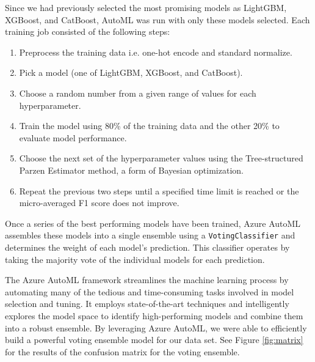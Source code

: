 \documentclass{article}
\begin{document}
Since we had previously selected the most promising models as LightGBM, XGBoost, and CatBoost, AutoML was run with only these models selected. Each training job consisted of the following steps:

\begin{enumerate}
  \item Preprocess the training data i.e. one-hot encode and standard normalize.
  \item Pick a model (one of LightGBM, XGBoost, and CatBoost).
  \item Choose a random number from a given range of values for each hyperparameter.
  \item Train the model using 80\% of the training data and the other 20\% to evaluate model performance.
  \item Choose the next set of the hyperparameter values using the Tree-structured Parzen Estimator method, a form of Bayesian optimization.
  \item Repeat the previous two steps until a specified time limit is reached or the micro-averaged F1 score does not improve.
\end{enumerate}

Once a series of the best performing models have been trained, Azure AutoML assembles these models into a single ensemble using a \texttt{VotingClassifier} and determines the weight of each model's prediction. This classifier operates by taking the majority vote of the individual models for each prediction.

The Azure AutoML framework streamlines the machine learning process by automating many of the tedious and time-consuming tasks involved in model selection and tuning.
It employs state-of-the-art techniques and intelligently explores the model space to identify high-performing models and combine them into a robust ensemble.
By leveraging Azure AutoML, we were able to efficiently build a powerful voting ensemble model for our data set.
See Figure \ref{fig:matrix} for the results of the confusion matrix for the voting ensemble. 
\end{document}

